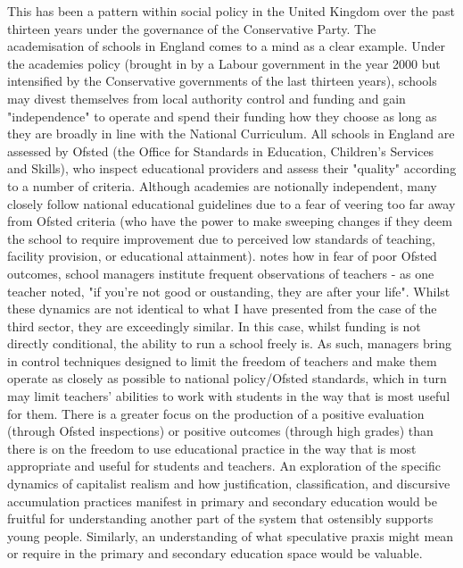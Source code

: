 This has been a pattern within social policy in the United Kingdom over the past thirteen years under the governance of the Conservative Party.  The academisation of schools in England comes to a mind as a clear example. Under the academies policy (brought in by a Labour government in the year 2000 but intensified by the Conservative governments of the last thirteen years), schools may divest themselves from local authority control and funding and gain "independence" to operate and spend their funding how they choose as long as they are broadly in line with the National Curriculum. All schools in England are assessed by Ofsted (the Office for Standards in Education, Children's Services and Skills), who inspect educational providers and assess their "quality" according to a number of criteria. Although academies are notionally independent, many closely follow national educational guidelines due to a fear of veering too far away from Ofsted criteria (who have the power to make sweeping changes if they deem the school to require improvement due to perceived low standards of teaching, facility provision, or educational attainment). \citet{kauko_evaluation_2015} notes how in fear of poor Ofsted outcomes, school managers institute frequent observations of teachers - as one teacher noted, "if you're not good or oustanding, they are after your life". Whilst these dynamics are not identical to what I have presented from the case of the third sector, they are exceedingly similar. In this case, whilst funding is not directly conditional, the ability to run a school freely is. As such, managers bring in control techniques designed to limit the freedom of teachers and make them operate as closely as possible to national policy/Ofsted standards, which in turn may limit teachers' abilities to work with students in the way that is most useful for them. There is a greater focus on the production of a positive evaluation (through Ofsted inspections) or positive outcomes (through high grades) than there is on the freedom to use educational practice in the way that is most appropriate and useful for students and teachers. An exploration of the specific dynamics of capitalist realism and how justification, classification, and discursive accumulation practices manifest in primary and secondary education would be fruitful for understanding another part of the system that ostensibly supports young people. Similarly, an understanding of what speculative praxis might mean or require in the primary and secondary education space would be valuable.

